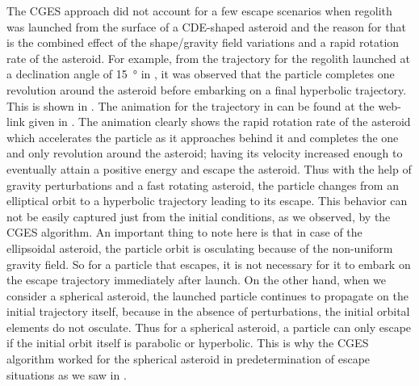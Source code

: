 \FloatBarrier
The \gls{CGES} approach did not account for a few escape scenarios when regolith was launched from the surface of a \gls{CDE}-shaped asteroid and the reason for that is the combined effect of the shape/gravity field variations and a rapid rotation rate of the asteroid. For example, from the trajectory for the regolith launched at a declination angle of \SI{15}{\degree} in , it was observed that the particle completes one revolution around the asteroid before embarking on a final hyperbolic trajectory. This is shown in .
%
\newline\newline
%
The animation for the trajectory in  can be found at the web-link given in . The animation clearly shows the rapid rotation rate of the asteroid which accelerates the particle as it approaches behind it and completes the one and only revolution around the asteroid; having its velocity increased enough to eventually attain a positive energy and escape the asteroid. Thus with the help of gravity perturbations and a fast rotating asteroid, the particle changes from an elliptical orbit to a hyperbolic trajectory leading to its escape. This behavior can not be easily captured just from the initial conditions, as we observed, by the \gls{CGES} algorithm.
%
\newline\newline
%
An important thing to note here is that in case of the ellipsoidal asteroid, the particle orbit is osculating because of the non-uniform gravity field. So for a particle that escapes, it is not necessary for it to embark on the escape trajectory immediately after launch. On the other hand, when we consider a spherical asteroid, the launched particle continues to propagate on the initial trajectory itself, because in the absence of perturbations, the initial orbital elements do not osculate. Thus for a spherical asteroid, a particle can only escape if the initial orbit itself is parabolic or hyperbolic. This is why the \gls{CGES} algorithm worked for the spherical asteroid in predetermination of escape situations as we saw in .
